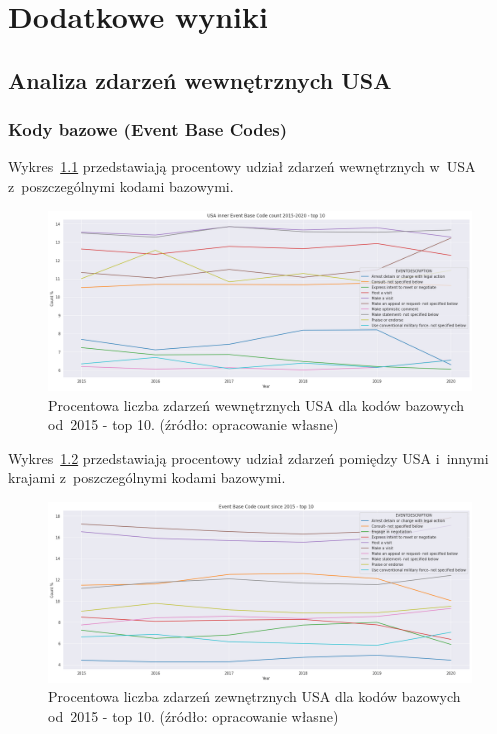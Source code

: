 \documentclass[11pt]{report}
\begin{document}
    \chapter{Dodatkowe wyniki}


    \section{Analiza zdarzeń wewnętrznych USA}

    \subsection{Kody bazowe (Event Base Codes)}\label{subsec:kody-bazowenullevent-base-codesnull2}
    Wykres~\ref{fig:USA_inner_EBCperc} przedstawiają procentowy udział zdarzeń wewnętrznych w~USA z~poszczególnymi kodami bazowymi.

    \begin{figure}[tp]
        \centering
        \includegraphics[width=\linewidth]{fig/USA inner/EBCperc.png}
        \caption{Procentowa liczba zdarzeń wewnętrznych USA dla kodów bazowych od~2015 - top 10. (źródło: opracowanie własne)}
        \label{fig:USA_inner_EBCperc}
    \end{figure}

    Wykres~\ref{fig:USA_not_inner_EBCperc} przedstawiają procentowy udział zdarzeń pomiędzy USA i~innymi krajami z~poszczególnymi kodami bazowymi.

    \begin{figure}[tp]
        \centering
        \includegraphics[width=\linewidth]{fig/USA not inner/EBCperc.png}
        \caption{Procentowa liczba zdarzeń zewnętrznych USA dla kodów bazowych od~2015 - top 10. (źródło: opracowanie własne)}
        \label{fig:USA_not_inner_EBCperc}
    \end{figure}
\end{document}

